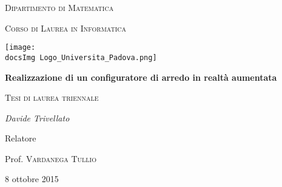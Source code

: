 \begin{titlepage}
	\centering
	{\scshape\LARGE Dipartimento di Matematica \par}
	\vspace{1cm}
	{\scshape\Large Corso di Laurea in Informatica\par}
	\vspace{1.5cm}
	
	\texttt{[image: \\docsImg Logo\_Universita\_Padova.png]}
	\vspace{1cm}
	
	{\huge\bfseries Realizzazione di un configuratore di arredo in realtà aumentata \par}
	\vspace{0.5cm}
	{\scshape\Large Tesi di laurea triennale\par}
	\vspace{2cm}
	
	{\Large\itshape Davide Trivellato\par}
	\vfill
	Relatore\par
	Prof. \textsc{Vardanega Tullio}
	
	\vfill
	
	{\large 8 ottobre 2015\par}
\end{titlepage}